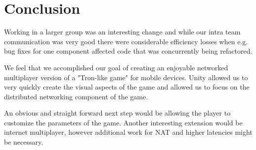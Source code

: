\documentclass{report}
\begin{document}
\section{Conclusion}
 Working in a larger group was an interesting change and while our intra team communication was very good there were considerable efficiency losses when e.g. bug fixes for one component affected code that was concurrently being refactored.

 We feel that we accomplished our goal of creating an enjoyable  networked multiplayer version of a "Tron-like game" for mobile devices. Unity allowed us to very quickly create the visual aspects of the game and allowed us to focus on the distributed networking component of the game.

An obvious and straight forward next step would be allowing the  player to customize the parameters of the game. Another interesting extension would be internet multiplayer, however additional work for NAT and higher latencies might be necessary.

\balancecolumns %


\end{document}
